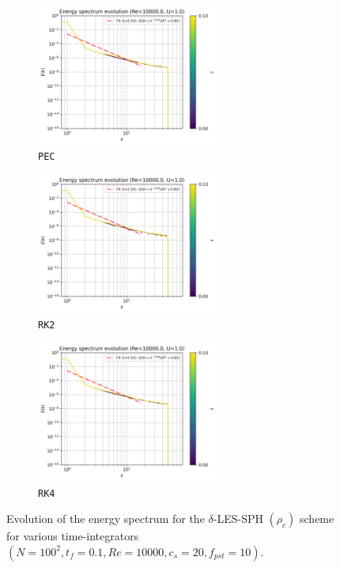 \begin{figure}[htbp!]
  \begin{subfigure}{7cm}
    \centering\includegraphics[width=6cm]{Code-Figures/deltales/integrator/c0_20_tait_pec_dtmul_1_nx_100_pst_10_re_10000_deltales/energy_spectrum_evolution.png}
    \caption{\texttt{PEC}}
  \end{subfigure}
  \begin{subfigure}{7cm}
    \centering\includegraphics[width=6cm]{Code-Figures/deltales/integrator/c0_20_tait_rk2_dtmul_1.5_nx_100_pst_10_re_10000_deltales/energy_spectrum_evolution.png}
    \caption{\texttt{RK2}}
  \end{subfigure}
  \begin{subfigure}{7cm}
    \centering\includegraphics[width=6cm]{Code-Figures/deltales/integrator/c0_20_tait_rk4_dtmul_2_nx_100_pst_10_re_10000_deltales/energy_spectrum_evolution.png}
    \caption{\texttt{RK4}}
  \end{subfigure}
  \caption{Evolution of the energy spectrum for the $\delta$-LES-SPH $(\rho_c)$ scheme for various time-integrators $(N=100^2, t_f=0.1, Re=10000, c_s=20, f_{pst}=10)$.}
  \label{fig:deltales-integrator-espec}
\end{figure}



